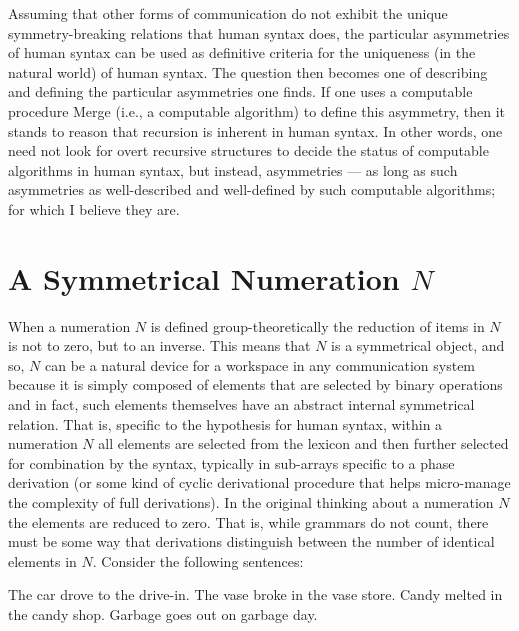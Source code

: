 \documentclass[11pt]{article}
\begin{document}
Assuming that other forms of communication do not exhibit the unique symmetry-breaking relations that human syntax does, the particular asymmetries of human syntax can be used as definitive criteria for the uniqueness (in the natural world) of human syntax. The question then becomes one of describing and defining the particular asymmetries one finds. If one uses a computable procedure Merge (i.e., a computable algorithm) to define this asymmetry, then it stands to reason that recursion is inherent in human syntax. In other words, one need not look for overt recursive structures to decide the status of computable algorithms in human syntax, but instead, asymmetries --- as long as such asymmetries as well-described and well-defined by such computable algorithms; for which I believe they are.


\section{A Symmetrical Numeration $N$}
When a numeration $N$ is defined group-theoretically the reduction of items in $N$ is not to zero, but to an inverse. This means that $N$ is a symmetrical object, and so, $N$ can be a natural device for a workspace in any communication system because it is simply composed of elements that are selected by binary operations and in fact, such elements themselves have an abstract internal symmetrical relation. That is, specific to the hypothesis for human syntax, within a numeration $N$ all elements are selected from the lexicon and then further selected for combination by the syntax, typically in sub-arrays specific to a phase derivation (or some kind of cyclic derivational procedure that helps micro-manage the complexity of full derivations). In the original thinking about a numeration $N$ the elements are reduced to zero. That is, while grammars do not count, there must be some way that derivations distinguish between the number of identical elements in $N$. Consider the following sentences:

\begin{exe}
\ex The car drove to the drive-in.\label{car} 
\ex The vase broke in the vase store.\label{vase} 
\ex Candy melted in the candy shop.\label{candy} 
\ex Garbage goes out on garbage day.\label{garbage} 
\end{exe}
\end{document}
